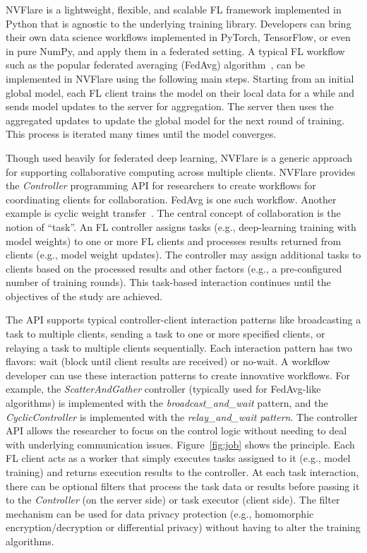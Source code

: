 \documentclass[11pt]{article}
\begin{document}
NVFlare is a lightweight, flexible, and scalable FL framework implemented in Python that is agnostic to the underlying training library. Developers can bring their own data science workflows implemented in PyTorch, TensorFlow, or even in pure NumPy, and apply them in a federated setting.
%
A typical FL workflow such as the popular federated averaging (FedAvg) algorithm~\cite{mcmahan2017communication}, can be implemented in NVFlare using the following main steps. Starting from an initial global model, each FL client trains the model on their local data for a while and sends model updates to the server for aggregation. The server then uses the aggregated updates to update the global model for the next round of training. This process is iterated many times until the model converges.

Though used heavily for federated deep learning, NVFlare is a generic approach for supporting collaborative computing across multiple clients. NVFlare provides the \textit{Controller} programming API for researchers to create workflows for coordinating clients for collaboration. FedAvg is one such workflow. Another example is cyclic weight transfer~\cite{chang2018distributed}.
%
The central concept of collaboration is the notion of ``task''. An FL controller assigns tasks (e.g., deep-learning training with model weights) to one or more FL clients and processes results returned from clients (e.g., model weight updates). The controller may assign additional tasks to clients based on the processed results and other factors (e.g., a pre-configured number of training rounds). This task-based interaction continues until the objectives of the study are achieved.

The API supports typical controller-client interaction patterns like broadcasting a task to multiple clients, sending a task to one or more specified clients, or relaying a task to multiple clients sequentially. Each interaction pattern has two flavors: wait (block until client results are received) or no-wait. A workflow developer can use these interaction patterns to create innovative workflows. For example, the \textit{ScatterAndGather} controller (typically used for FedAvg-like algorithms) is implemented with the \textit{broadcast\_and\_wait} pattern, and the \textit{CyclicController} is implemented with the \textit{relay\_and\_wait pattern}. The controller API allows the researcher to focus on the control logic without needing to deal with underlying communication issues. Figure~\ref{fig:job} shows the principle.
%
Each FL client acts as a worker that simply executes tasks assigned to it (e.g., model training) and returns execution results to the controller. At each task interaction, there can be optional filters that process the task data or results before passing it to the \textit{Controller} (on the server side) or task executor (client side). The filter mechanism can be used for data privacy protection (e.g., homomorphic encryption/decryption or differential privacy) without having to alter the training algorithms.
\end{document}
